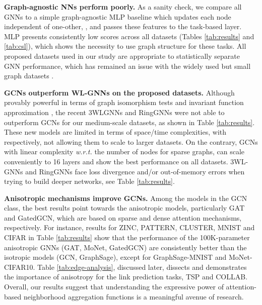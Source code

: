 \documentclass{article}
\begin{document}
{\bf Graph-agnostic NNs perform poorly.} As a sanity check, we compare all GNNs to a simple graph-agnostic MLP baseline which updates each node independent of one-other, , and passes 
these features to the task-based layer. MLP presents consistently low scores across all datasets (Tables \ref{tab:results} and \ref{tab:csl}), 
which shows the necessity to use graph structure for these tasks. All proposed datasets used in our study are appropriate to statistically separate GNN performance, which has remained an issue with the widely used but small graph datasets \cite{errica2019fair,luzhnica2019graph}.








{\bf GCNs outperform WL-GNNs on the proposed datasets.} 
Although provably powerful in terms of graph isomorphism tests and invariant function approximation \cite{maron2019universality,chen2019equivalence,morris2019weisfeiler}, the recent 3WLGNNs and RingGNNs were not able to outperform GCNs for our medium-scale datasets, as shown in Table \ref{tab:results}. These new models are limited in terms of space/time complexities, with  respectively, not allowing them to scale to larger datasets. On the contrary, GCNs with linear complexity \textit{w.r.t.} the number of nodes for sparse graphs, can scale conveniently to 16 layers and show the best performance on all datasets. 
3WL-GNNs and RingGNNs face loss divergence and/or out-of-memory errors when trying to build deeper networks, see Table \ref{tab:results}.







{\bf Anisotropic mechanisms improve GCNs.} Among the models in the GCN class, the best results point towards the anisotropic models, particularly GAT and GatedGCN, which are based on sparse and dense attention mechanisms, respectively. 
For instance, results for ZINC, PATTERN, CLUSTER, MNIST and CIFAR in Table \ref{tab:results}
show that the performance of the 100K-parameter anisotropic GNNs (GAT, MoNet, GatedGCN) are consistently better than the isotropic models (GCN, GraphSage), except for GraphSage-MNIST and MoNet-CIFAR10.
Table \ref{tab:edge-analysis}, discussed later, dissects and demonstrates the importance of anisotropy for the link prediction tasks, TSP and COLLAB. 
Overall, our results suggest that understanding the expressive power of attention-based neighborhood aggregation functions is a meaningful avenue of research. 
\end{document}
